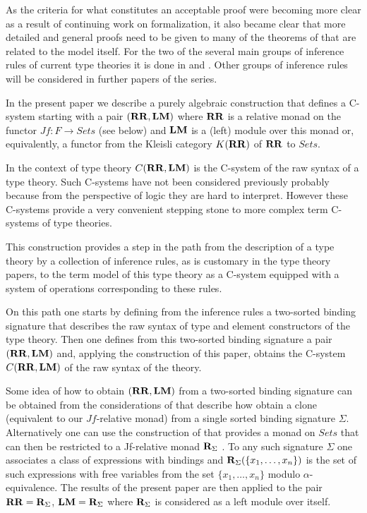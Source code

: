 \documentclass[11pt]{article}
\newcommand{\sr}{\rightarrow}
\newcommand{\rr}{{\bf R}}
\newcommand{\RR}{{\bf RR}}
\newcommand{\LM}{{\bf LM}}
\begin{document}
As the criteria for what constitutes an acceptable proof were becoming more clear as a result of continuing work on formalization, it also became clear that more detailed and general proofs need to be given to many of the theorems of \cite{KLV1} that are related to the model itself. For the two of the several main groups of inference rules of current type theories it is done in \cite{fromunivwithPi} and \cite{fromunivwithpaths}. Other groups of inference rules will be considered in further papers of the series. 

In the present paper we describe a purely algebraic construction that defines a C-system starting with a pair $(\RR,\LM)$ where $\RR$ is a relative monad on the functor $Jf:F\sr Sets$ (see below) and $\LM$ is a (left) module over this monad or, equivalently, a functor from the Kleisli category $K(\RR)$ of $\RR$ to $Sets$.

In the context of type theory $C(\RR,\LM)$ is the C-system of the raw syntax of a type theory. Such C-systems have not been considered previously probably because from the perspective of logic they are hard to interpret. However these C-systems provide a very convenient stepping stone to more complex term C-systems of type theories. 

This construction provides a step in the path from the description of a type theory by a collection of inference rules, as is customary in the type theory papers, to the term model of this type theory as a C-system equipped with a system of operations corresponding to these rules. 

On this path one starts by defining from the inference rules a two-sorted binding signature that describes the raw syntax of type and element constructors of the type theory. Then one defines from this two-sorted binding signature a pair $(\RR,\LM)$ and, applying the construction of this paper, obtains the C-system $C(\RR,\LM)$ of the raw syntax of the theory. 

Some idea of how to obtain $(\RR,\LM)$ from a two-sorted binding signature can be obtained from the considerations of \cite{FPT} that describe how obtain a clone (equivalent to our $Jf$-relative monad) from a single sorted binding signature $\Sigma$. Alternatively one can use the construction of \cite{HM2007} that provides a monad on $Sets$ that can then be restricted to a Jf-relative monad $\rr_{\Sigma}$ . To any such signature $\Sigma$ one associates a class of expressions with bindings and $\rr_{\Sigma}(\{x_1,\dots,x_n\})$ is the set of such expressions with free variables from the set $\{x_1,\dots,x_n\}$ modulo $\alpha$-equivalence.  The results of the present paper are then applied to the pair $\RR=\rr_{\Sigma}$, $\LM=\rr_{\Sigma}$ where $\rr_{\Sigma}$ is considered as a left module over itself. 
\end{document}
